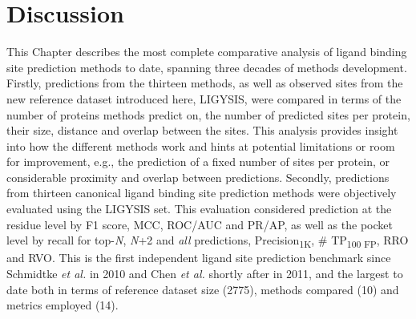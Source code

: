 \section{Discussion}

This Chapter describes the most complete comparative analysis of ligand binding site prediction methods to date, spanning three decades of methods development. Firstly, predictions from the thirteen methods, as well as observed sites from the new reference dataset introduced here, LIGYSIS, were compared in terms of the number of proteins methods predict on, the number of predicted sites per protein, their size, distance and overlap between the sites. This analysis provides insight into how the different methods work and hints at potential limitations or room for improvement, e.g., the prediction of a fixed number of sites per protein, or considerable proximity and overlap between predictions. Secondly, predictions from thirteen canonical ligand binding site prediction methods were objectively evaluated using the LIGYSIS set. This evaluation considered prediction at the residue level by F1 score, MCC, ROC/AUC and PR/AP, as well as the pocket level by recall for top-\textit{N}, \textit{N}+2 and \textit{all} predictions, Precision\textsubscript{1K}, \# TP\textsubscript{100 FP}, RRO and RVO. This is the first independent ligand site prediction benchmark since Schmidtke \textit{et al.} \cite{SCHMIDTKE_2010_BENCHMARK} in 2010 and Chen \textit{et al.} \cite{CHEN_2011_ASSESSMENT} shortly after in 2011, and the largest to date both in terms of reference dataset size (2775), methods compared (10) and metrics employed (14).

\newpage

